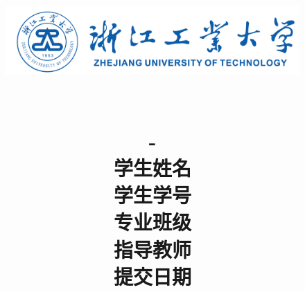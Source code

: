 \title{
  \begin{figure}[H]
    \centering
    \includegraphics[width=1\textwidth]{./img/university.png}
  \end{figure} 
  \vspace{3em}
  \huge \textbf{\reportName} \\ 
  \vspace{1em}
  \large \textbf{\className-\reportType}\\
  \vspace{5em}
  \large 学生姓名\hspace{0.7cm}\underline{\makebox[5.5cm]{\studentName}} \\
  \large 学生学号\hspace{0.7cm}\underline{\makebox[5.5cm]{\studentID}} \\
  \large 专业班级\hspace{0.7cm}\underline{\makebox[5.5cm]{\studentGrade}} \\
  \large 指导教师\hspace{0.7cm}\underline{\makebox[5.5cm]{\prof}} \\
  \large 提交日期\hspace{0.7cm}\underline{} \\
}

\author{}
\date{}


